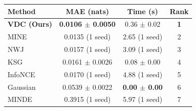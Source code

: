 \begin{tabular}{lccc}
\toprule
Method & MAE (nats) & Time (s) & Rank \\
\midrule
\textbf{VDC (Ours)} & \textbf{0.0106 $\pm$ 0.0050} & 0.36 $\pm$ 0.02 & \textbf{1} \\
MINE & 0.0135 (1 seed) & 2.65 (1 seed) & 2 \\
NWJ & 0.0157 (1 seed) & 3.09 (1 seed) & 3 \\
KSG & 0.0161 $\pm$ 0.0026 & 0.08 $\pm$ 0.00 & 4 \\
InfoNCE & 0.0170 (1 seed) & 4.88 (1 seed) & 5 \\
Gaussian & 0.0539 $\pm$ 0.0022 & \textbf{0.00 $\pm$ 0.00} & 6 \\
MINDE & 0.3915 (1 seed) & 5.97 (1 seed) & 7 \\
\bottomrule
\end{tabular}

